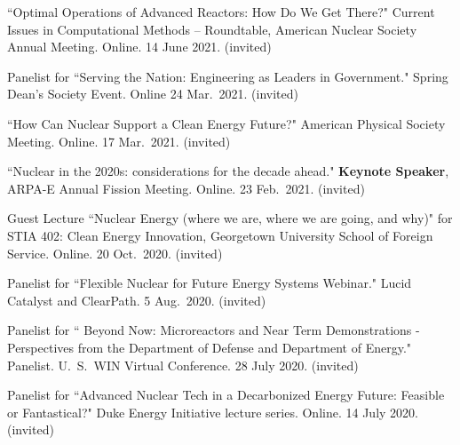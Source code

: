 \begin{bibsection}
\item ``Optimal Operations of Advanced Reactors: How Do We Get There?" Current Issues in Computational Methods -- Roundtable, American Nuclear Society Annual Meeting. Online. 14 June 2021. (invited)


\item Panelist for ``Serving the Nation: Engineering as Leaders in Government." Spring Dean's Society Event. Online 24 Mar.\ 2021. (invited)

\item ``How Can Nuclear Support a Clean Energy Future?"  American Physical Society Meeting. Online. 17 Mar.\ 2021. (invited)

\item ``Nuclear in the 2020s: considerations for the decade ahead." \textbf{Keynote Speaker}, ARPA-E Annual Fission Meeting. Online. 23 Feb.\ 2021. (invited)

\item Guest Lecture ``Nuclear Energy (where we are, where we are going, and why)" for STIA 402: Clean Energy Innovation, Georgetown University School of Foreign Service. Online. 20 Oct.\ 2020. (invited)




\item Panelist for ``Flexible Nuclear for Future Energy
Systems Webinar." Lucid Catalyst and ClearPath. 5 Aug.\ 2020. (invited) 

\item Panelist for `` Beyond Now: Microreactors and Near Term Demonstrations - Perspectives from
the Department of Defense and Department of Energy." Panelist. U.\ S.\ WIN Virtual
Conference. 28 July 2020. (invited) 

\item Panelist for ``Advanced Nuclear Tech in a Decarbonized Energy Future:
Feasible or Fantastical?" Duke Energy Initiative lecture series.
Online. 14 July 2020. (invited)


\end{bibsection}
